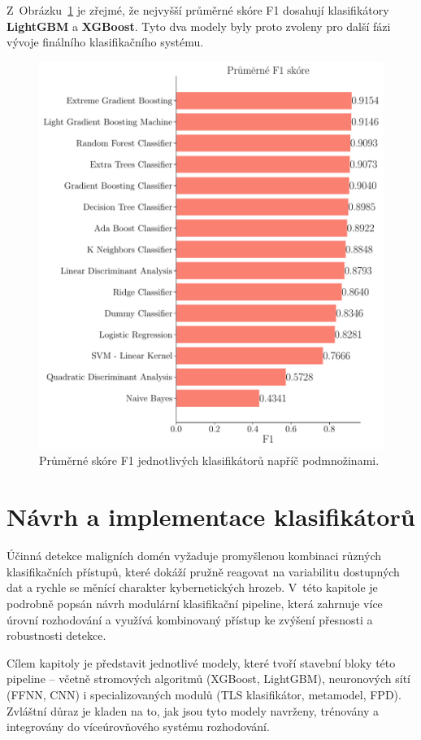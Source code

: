 Z~Obrázku~\ref{fig:avg_models} je zřejmé, že nejvyšší průměrné skóre F1 dosahují klasifikátory \textbf{LightGBM} a \textbf{XGBoost}. Tyto dva modely byly proto zvoleny pro další fázi vývoje finálního klasifikačního systému.

\begin{figure}[h]
  \centering
  \includegraphics[width=0.8\columnwidth]{obrazky-figures/average_f1_models.pdf}
  \caption{Průměrné skóre F1 jednotlivých klasifikátorů napříč podmnožinami.}
  \label{fig:avg_models}
\end{figure}


\chapter{Návrh a implementace klasifikátorů}
\label{chapter:8}


Účinná detekce maligních domén vyžaduje promyšlenou kombinaci různých klasifikačních přístupů, které dokáží pružně reagovat na variabilitu dostupných dat a rychle se měnící charakter kybernetických hrozeb. V~této kapitole je podrobně popsán návrh modulární klasifikační pipeline, která zahrnuje více úrovní rozhodování a využívá kombinovaný přístup ke zvýšení přesnosti a robustnosti detekce.

Cílem kapitoly je představit jednotlivé modely, které tvoří stavební bloky této pipeline – včetně stromových algoritmů (XGBoost, LightGBM), neuronových sítí (FFNN, CNN) i specializovaných modulů (TLS klasifikátor, metamodel, FPD). Zvláštní důraz je kladen na to, jak jsou tyto modely navrženy, trénovány a integrovány do víceúrovňového systému rozhodování.

